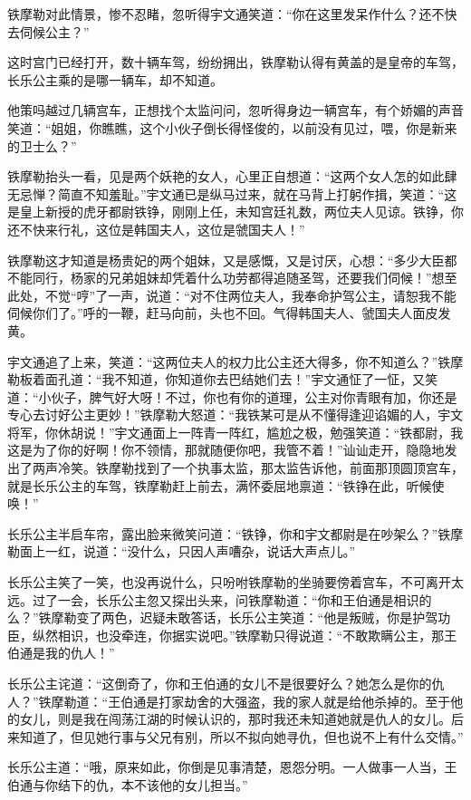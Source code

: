 \documentclass[12pt,oneside]{book}
\begin{document}
铁摩勒对此情景，惨不忍睹，忽听得宇文通笑道：``你在这里发呆作什么？还不快去伺候公主？''

这时宫门已经打开，数十辆车驾，纷纷拥出，铁摩勒认得有黄盖的是皇帝的车驾，长乐公主乘的是哪一辆车，却不知道。

他策吗越过几辆宫车，正想找个太监问问，忽听得身边一辆宫车，有个娇媚的声音笑道：``姐姐，你瞧瞧，这个小伙子倒长得怪俊的，以前没有见过，喂，你是新来的卫士么？''

铁摩勒抬头一看，见是两个妖艳的女人，心里正自想道：``这两个女人怎的如此肆无忌惮？简直不知羞耻。''宇文通已是纵马过来，就在马背上打躬作揖，笑道：``这是皇上新授的虎牙都尉铁铮，刚刚上任，未知宫廷礼数，两位夫人见谅。铁铮，你还不快来行礼，这位是韩国夫人，这位是虢国夫人！''

铁摩勒这才知道是杨贵妃的两个姐妹，又是感慨，又是讨厌，心想：``多少大臣都不能同行，杨家的兄弟姐妹却凭着什么功劳都得追随圣驾，还要我们伺候！''想至此处，不觉``哼''了一声，说道：``对不住两位夫人，我奉命护驾公主，请恕我不能伺候你们了。''呼的一鞭，赶马向前，头也不回。气得韩国夫人、虢国夫人面皮发黄。

宇文通追了上来，笑道：``这两位夫人的权力比公主还大得多，你不知道么？''铁摩勒板着面孔道：``我不知道，你知道你去巴结她们去！''宇文通怔了一怔，又笑道：``小伙子，脾气好大呀！不过，你也有你的道理，公主对你青眼有加，你还是专心去讨好公主更妙！''铁摩勒大怒道：``我铁某可是从不懂得逢迎谄媚的人，宇文将军，你休胡说！''宇文通面上一阵青一阵红，尴尬之极，勉强笑道：``铁都尉，我这是为了你的好啊！你不领情，那就随便你吧，我管不着！''讪讪走开，隐隐地发出了两声冷笑。铁摩勒找到了一个执事太监，那太监告诉他，前面那顶圆顶宫车，就是长乐公主的车驾，铁摩勒赶上前去，满怀委屈地禀道：``铁铮在此，听候使唤！''

长乐公主半启车帘，露出脸来微笑问道：``铁铮，你和宇文都尉是在吵架么？''铁摩勒面上一红，说道：``没什么，只因人声嘈杂，说话大声点儿。''

长乐公主笑了一笑，也没再说什么，只吩咐铁摩勒的坐骑要傍着宫车，不可离开太远。过了一会，长乐公主忽又探出头来，问铁摩勒道：``你和王伯通是相识的么？''铁摩勒变了两色，迟疑未敢答话，长乐公主笑道：``他是叛贼，你是护驾功臣，纵然相识，也没牵连，你据实说吧。''铁摩勒只得说道：``不敢欺瞒公主，那王伯通是我的仇人！''

长乐公主诧道：``这倒奇了，你和王伯通的女儿不是很要好么？她怎么是你的仇人？''铁摩勒道：``王伯通是打家劫舍的大强盗，我的家人就是给他杀掉的。至于他的女儿，则是我在闯荡江湖的时候认识的，那时我还未知道她就是仇人的女儿。后来知道了，但见她行事与父兄有别，所以不拟向她寻仇，但也说不上有什么交情。''

长乐公主道：``哦，原来如此，你倒是见事清楚，恩怨分明。一人做事一人当，王伯通与你结下的仇，本不该他的女儿担当。''
\end{document}
